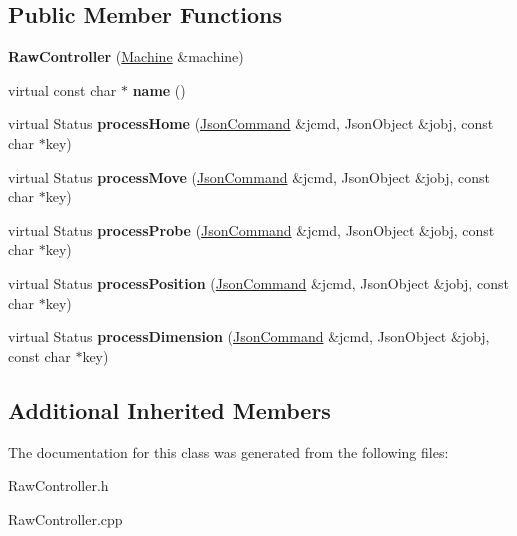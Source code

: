 \subsection*{Public Member Functions}
\begin{DoxyCompactItemize}
\item 
\hypertarget{classfirestep_1_1_raw_controller_a293df6216a42933432d54bebbb8af801}{{\bfseries Raw\+Controller} (\hyperlink{classfirestep_1_1_machine}{Machine} \&machine)}\label{classfirestep_1_1_raw_controller_a293df6216a42933432d54bebbb8af801}

\item 
\hypertarget{classfirestep_1_1_raw_controller_a47928dcc5b8f8f15ade9803afa6e7e5e}{virtual const char $\ast$ {\bfseries name} ()}\label{classfirestep_1_1_raw_controller_a47928dcc5b8f8f15ade9803afa6e7e5e}

\item 
\hypertarget{classfirestep_1_1_raw_controller_a9c2f0815a53c189eadef1e7d7b701a01}{virtual Status {\bfseries process\+Home} (\hyperlink{classfirestep_1_1_json_command}{Json\+Command} \&jcmd, Json\+Object \&jobj, const char $\ast$key)}\label{classfirestep_1_1_raw_controller_a9c2f0815a53c189eadef1e7d7b701a01}

\item 
\hypertarget{classfirestep_1_1_raw_controller_a964f04820190682fe19bdfe537f95d1d}{virtual Status {\bfseries process\+Move} (\hyperlink{classfirestep_1_1_json_command}{Json\+Command} \&jcmd, Json\+Object \&jobj, const char $\ast$key)}\label{classfirestep_1_1_raw_controller_a964f04820190682fe19bdfe537f95d1d}

\item 
\hypertarget{classfirestep_1_1_raw_controller_aab2d0ed73fda85c29dd29145a04b2642}{virtual Status {\bfseries process\+Probe} (\hyperlink{classfirestep_1_1_json_command}{Json\+Command} \&jcmd, Json\+Object \&jobj, const char $\ast$key)}\label{classfirestep_1_1_raw_controller_aab2d0ed73fda85c29dd29145a04b2642}

\item 
\hypertarget{classfirestep_1_1_raw_controller_ae80c97767a50bdf01c358b30a9a14e5f}{virtual Status {\bfseries process\+Position} (\hyperlink{classfirestep_1_1_json_command}{Json\+Command} \&jcmd, Json\+Object \&jobj, const char $\ast$key)}\label{classfirestep_1_1_raw_controller_ae80c97767a50bdf01c358b30a9a14e5f}

\item 
\hypertarget{classfirestep_1_1_raw_controller_a12d9b40ef8c8a4293c4918bad8c6862c}{virtual Status {\bfseries process\+Dimension} (\hyperlink{classfirestep_1_1_json_command}{Json\+Command} \&jcmd, Json\+Object \&jobj, const char $\ast$key)}\label{classfirestep_1_1_raw_controller_a12d9b40ef8c8a4293c4918bad8c6862c}

\end{DoxyCompactItemize}
\subsection*{Additional Inherited Members}


The documentation for this class was generated from the following files\+:\begin{DoxyCompactItemize}
\item 
Raw\+Controller.\+h\item 
Raw\+Controller.\+cpp\end{DoxyCompactItemize}
